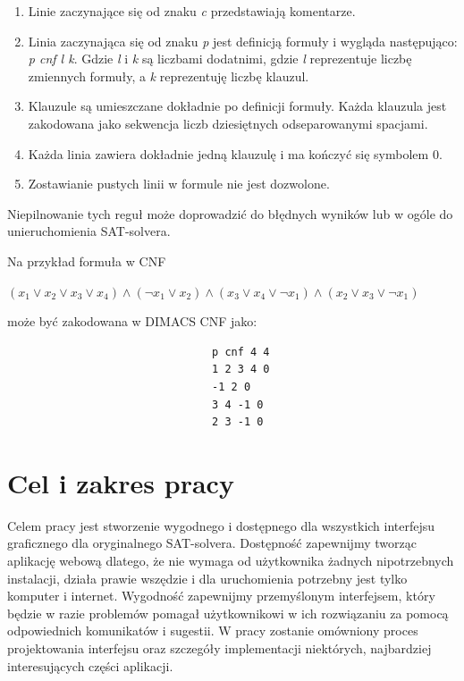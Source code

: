 \documentclass[a4paper,12pt,oneside]{book}
\theoremstyle{definition}
\begin{document}
\begin{enumerate}
    \item Linie zaczynające się od znaku \textit{c} przedstawiają komentarze.
    \item Linia zaczynająca się od znaku \textit{p} jest definicją formuły i wygląda następująco: \textit{p cnf l k}. Gdzie \textit{l} i \textit{k} są liczbami dodatnimi, gdzie \textit{l} reprezentuje liczbę zmiennych formuły, a \textit{k} reprezentuję liczbę klauzul.
    \item Klauzule są umieszczane dokładnie po definicji formuły. Każda klauzula jest zakodowana jako sekwencja liczb dziesiętnych odseparowanymi spacjami.
    \item Każda linia zawiera dokładnie jedną klauzulę i ma kończyć się symbolem 0.
    \item Zostawianie pustych linii w formule nie jest dozwolone.
\end{enumerate}
Niepilnowanie tych reguł może doprowadzić do błędnych wyników lub w ogóle do unieruchomienia SAT-solvera.

Na przykład formuła w CNF

\begin{center}
    $(x_1 \lor x_2 \lor x_3 \lor x_4) \land (\neg x_1 \lor x_2) \land (x_3 \lor x_4 \lor \neg x_1) \land (x_2 \lor x_3 \lor \neg x_1)$ 
\end{center}

może być zakodowana w DIMACS CNF jako:

\begin{verbatim}
                                p cnf 4 4
                                1 2 3 4 0
                                -1 2 0
                                3 4 -1 0
                                2 3 -1 0
\end{verbatim}

\section{Cel i zakres pracy}

Celem pracy jest stworzenie wygodnego i dostępnego dla wszystkich interfejsu graficznego dla oryginalnego SAT-solvera. Dostępność zapewnijmy tworząc aplikację webową dlatego, że nie wymaga od użytkownika żadnych nipotrzebnych instalacji, działa prawie wszędzie i dla uruchomienia potrzebny jest tylko komputer i internet. Wygodność zapewnijmy przemyślonym interfejsem, który będzie w razie problemów pomagał użytkownikowi w ich rozwiązaniu za pomocą odpowiednich komunikatów i sugestii. W pracy zostanie omówniony proces projektowania interfejsu oraz szczegóły implementacji niektórych, najbardziej interesujących części aplikacji. 
\end{document}
